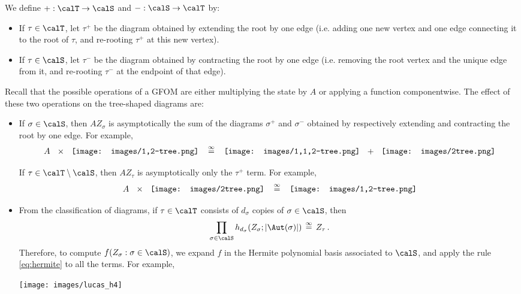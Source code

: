 \documentclass[12pt]{article}
\newcommand{\eqinf}{\,\overset{\infty}{=}\,}
\begin{document}
\begin{definition}
    \label{def:plus-minus-operators}
    We define $+:\calT\to\calS$ and $-:\calS\to\calT$ by:
    \begin{itemize}
        \item If $\tau\in\calT$, let $\tau^+$ be the diagram
        obtained by extending the root by one edge (i.e.
        adding one new vertex and one edge connecting
        it to the root of $\tau$, and re-rooting 
        $\tau^+$ at this new vertex).
        \item If $\tau\in \calS$, let $\tau^-$
        be the diagram obtained by contracting the 
        root by one edge (i.e. removing the root vertex
        and the unique edge from it, and re-rooting
        $\tau^-$ at the endpoint of that edge).
    \end{itemize}
\end{definition}

Recall that the possible operations of a GFOM 
are either multiplying the state by $A$ or applying
a function componentwise. 
The effect of these two operations on the tree-shaped
diagrams are:

\begin{itemize}

    \item If $\sigma\in\calS$, then
    $A Z_\sigma$ is asymptotically the sum of the diagrams
    $\sigma^+$ and $\sigma^-$ obtained by respectively 
    extending and
    contracting the root by one edge. For example,
    \[A \ \ \times\ \  \vcenter{\hbox{\texttt{[image: images/1,2-tree.png]}}} \ \ \eqinf \ \ \vcenter{\hbox{\texttt{[image: images/1,1,2-tree.png]}}} \ \  + \ \  \vcenter{\hbox{\texttt{[image: images/2tree.png]}}}\]
    
    If $\tau \in \calT \setminus \calS$, then
    $AZ_\tau$ is asymptotically only the $\tau^+$ term. For example,
    \[A \ \ \times\ \  \vcenter{\hbox{\texttt{[image: images/2tree.png]}}} \ \ \eqinf \ \ 
    \vcenter{\hbox{\texttt{[image: images/1,2-tree.png]}}}\]

    \item From the classification of diagrams, if $\tau\in\calT$ consists of $d_\sigma$ copies of $\sigma\in\calS$, then 
    \begin{align}
        \prod_{\sigma\in\calS} h_{d_\sigma}(Z_\sigma;\left|\Aut(\sigma)\right|)\eqinf Z_\tau \,.\label{eq:hermite}
    \end{align}
    Therefore,
    to compute $f(Z_\sigma:\sigma\in \calS)$, we expand $f$ in the Hermite
    polynomial basis associated to $\calS$, and
    apply the rule \cref{eq:hermite} to all
    the terms. For example,

    \begin{center}
        \texttt{[image: images/lucas\_h4]}
    \end{center}
\end{itemize}
\end{document}
